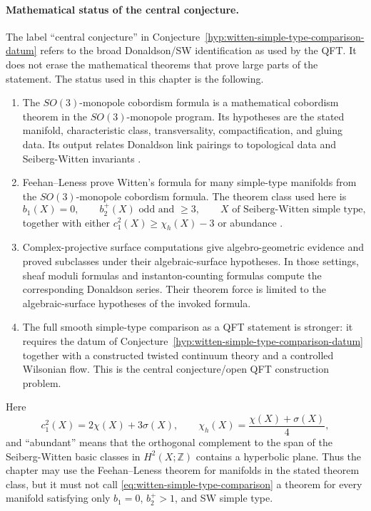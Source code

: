 \paragraph{Mathematical status of the central conjecture.}
The label ``central conjecture'' in
Conjecture~\ref{hyp:witten-simple-type-comparison-datum} refers to the broad
Donaldson/SW identification as used by the QFT.  It does not erase the
mathematical theorems that prove large parts of the statement.  The status used
in this chapter is the following.
\begin{enumerate}
\item The \(SO(3)\)-monopole cobordism formula is a mathematical cobordism
theorem in the \(SO(3)\)-monopole program.  Its hypotheses are the stated
manifold, characteristic class, transversality, compactification, and gluing
data.  Its output relates Donaldson link pairings to topological data and
Seiberg-Witten invariants \cite{FeehanLeness2002SO3MonopoleCobordism}.
\item Feehan--Leness prove Witten's formula for many simple-type manifolds
from the \(SO(3)\)-monopole cobordism formula.  The theorem class used here is
\[
  b_1(X)=0,\qquad b_2^+(X)\text{ odd and }\ge3,\qquad
  X\text{ of Seiberg-Witten simple type},
\]
together with either \(c_1^2(X)\ge\chi_h(X)-3\) or abundance
\cite{FeehanLeness2015WittenConjecture}.
\item Complex-projective surface computations give algebro-geometric
evidence and proved subclasses under their algebraic-surface hypotheses.  In
those settings, sheaf moduli formulas and instanton-counting formulas compute
the corresponding Donaldson series.  Their theorem force is limited to the
algebraic-surface hypotheses of the invoked formula.
\item The full smooth simple-type comparison as a QFT statement is stronger:
it requires the datum of
Conjecture~\ref{hyp:witten-simple-type-comparison-datum} together with a
constructed twisted continuum theory and a controlled Wilsonian flow.  This is
the central conjecture/open QFT construction problem.
\end{enumerate}
Here
\[
  c_1^2(X)=2\chi(X)+3\sigma(X),\qquad
  \chi_h(X)=\frac{\chi(X)+\sigma(X)}{4},
\]
and ``abundant'' means that the orthogonal complement to the span of the
Seiberg-Witten basic classes in \(H^2(X;\mathbb Z)\) contains a hyperbolic
plane.  Thus the chapter may use the Feehan--Leness theorem for manifolds in
the stated theorem class, but it must not call
\eqref{eq:witten-simple-type-comparison} a theorem for every manifold
satisfying only \(b_1=0\), \(b_2^+>1\), and SW simple type.

